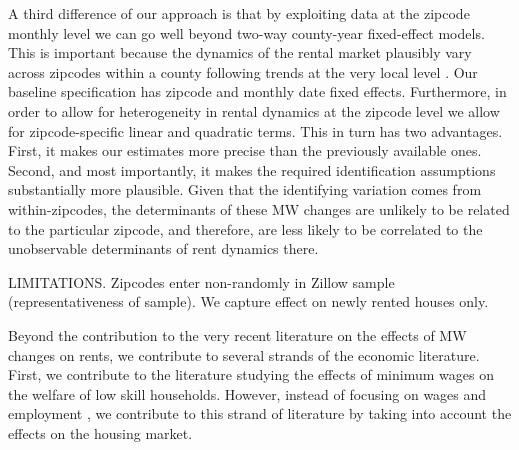 
A third difference of our approach is that by exploiting data at the zipcode monthly level we can go 
well beyond two-way county-year fixed-effect models. This is important because the dynamics of the 
rental market plausibly vary across zipcodes within a county following trends at the very local level 
\parencite{almagro2019location}. Our baseline specification has zipcode and monthly date fixed 
effects. Furthermore, in order to allow for heterogeneity in rental dynamics at the zipcode level we 
allow for zipcode-specific linear and quadratic terms. This in turn has two advantages. First, it 
makes our estimates more precise than the previously available ones. Second, and most importantly, it 
makes the required identification assumptions substantially more plausible. Given that the identifying 
variation comes from within-zipcodes, the determinants of these MW changes are unlikely to be related 
to the particular zipcode, and therefore, are less likely to be correlated to the unobservable 
determinants of rent dynamics there.


LIMITATIONS. Zipcodes enter non-randomly in Zillow sample (representativeness of sample). We capture effect on newly rented houses only.

Beyond the contribution to the very recent literature on the effects of MW changes on rents, we 
contribute to several strands of the economic literature. First, we contribute to the literature 
studying the effects of minimum wages on the welfare of low skill households. However, instead of 
focusing on wages and employment \parencite[][among others]{dinardo1995labor, autor2016contribution, 
card2000minimum, neumark2006minimum, jardim2017minimum}, we contribute to this strand of literature 
by taking into account the effects on the housing market.

